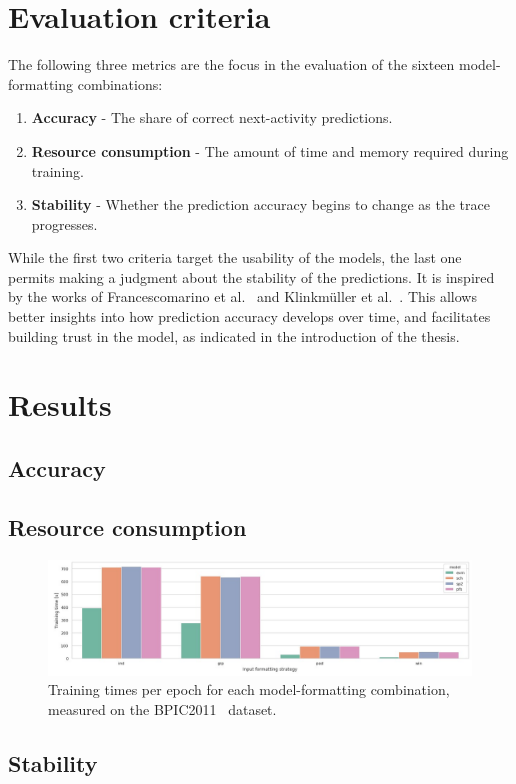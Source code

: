 \section{Evaluation criteria}
\label{sec:eval:criteria}
The following three metrics are the focus in the evaluation of the sixteen model-formatting combinations:

\begin{enumerate}
    \item\textbf{Accuracy} - The share of correct next-activity predictions.
    \item\textbf{Resource consumption} - The amount of time and memory required during training.
    \item\textbf{Stability} - Whether the prediction accuracy begins to change as the trace progresses.
\end{enumerate}

While the first two criteria target the usability of the models, the last one permits making a judgment about the stability of the predictions. It is inspired by the works of Francescomarino et al.~\cite{francescomarino2015} and Klinkmüller et al.~\cite{klinkmuller2018reliablemonitoring}. This allows better insights into how prediction accuracy develops over time, and facilitates building trust in the model, as indicated in the introduction of the thesis.

\section{Results}\label{sec:eval:results}


\subsection*{Accuracy}

\subsection*{Resource consumption}
\begin{figure}
    \centering
    \includegraphics[width=\textwidth]{gfx/bpic2011-training-timings.jpg}
    \caption{Training times per epoch for each model-formatting combination, measured on the BPIC2011~\cite{BPIC2011} dataset.}
    \label{fig:timings_bpic2011}
\end{figure}

\subsection*{Stability}